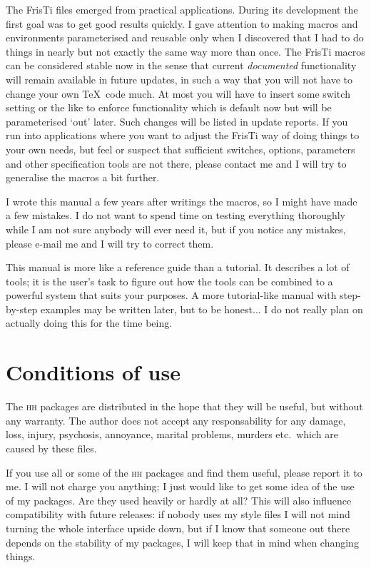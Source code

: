 \documentclass[11pt]{article}
\begin{document}
The FrisTi files emerged from practical applications. During its
development the first goal was to get good results quickly.
I gave attention to making macros and environments parameterised
and reusable only when I discovered that I had to do things in nearly
but not exactly the same way more than once.
The FrisTi macros can be considered stable now in the sense
that current \emph{documented} functionality will remain available in
future updates, in such a way that you will not have to change your
own \TeX\ code much. At most you will have to insert some switch setting or
the like to enforce functionality which is default now but
will be parameterised `out' later. Such changes will be
listed in update reports. If you run into applications where
you want to adjust the FrisTi way of doing things to your
own needs, but feel or suspect that sufficient switches, options,
parameters and other specification tools are not there, please
contact me and I will try to generalise the macros a bit further.

I wrote this manual a few years after writings the macros, so I
might have made a few mistakes. I do not want to spend time on
testing everything thoroughly while I am not sure anybody will
ever need it, but if you notice any mistakes, please e-mail me
and I will try to correct them.

This manual is more like a reference guide than a tutorial.
It describes a lot of tools; it is the user's task to figure out
how the tools can be combined to a powerful system that suits
your purposes. A more tutorial-like manual with step-by-step
examples may be written later, but to be honest... I do not
really plan on actually doing this for the time being.

\section{Conditions of use}

The \textsc{hh} packages are distributed in the hope that they will be useful,
but without any warranty. The author does not accept any responsability for any
damage, loss, injury, psychosis, annoyance, marital problems, murders etc.\
which are caused by these files.

If you use all or some of the \textsc{hh} packages and find them useful, please
report it to me. I will not charge you anything; I just would like to
get some idea of the use of my packages. Are they used heavily or hardly
at all? This will also influence compatibility with future releases:
if nobody uses my style files I will not mind turning the whole
interface upside down, but if I know that someone out there depends on
the stability of my packages, I will keep that in mind when changing
things.
\end{document}
